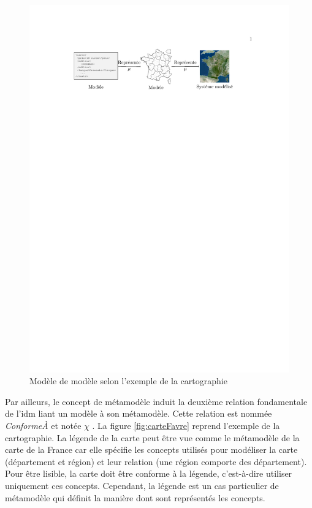 \begin{figure}[!ht]
    \includegraphics[trim= 100 635 400 100]{figures/3_etat_de_l_art_IDM/modele_carte.pdf} %
    \caption{Modèle de modèle selon l'exemple de la cartographie 
    \protect\cite{favre2006ingenierie}}
    \label{fig:modelofmodel}
\end{figure}

Par ailleurs, le concept de métamodèle induit la deuxième relation fondamentale 
de l'\gls{idm} liant un modèle à son métamodèle. Cette relation est nommée 
\textit{ConformeÀ} et notée $\chi$ \cite{bezivin2004search} 
\cite{favre2004towards}. La figure \ref{fig:carteFavre} reprend l'exemple de la 
cartographie. La légende de la carte peut être vue comme le métamodèle de la
carte de la France car elle spécifie les concepts utilisés pour modéliser la carte
(département et région) et leur relation (une région comporte des département).
Pour être lisible, la carte doit être conforme à la légende, c'est-à-dire utiliser
uniquement ces concepts. Cependant, la légende est un cas particulier de métamodèle 
qui définit la manière dont sont représentés les concepts. 

